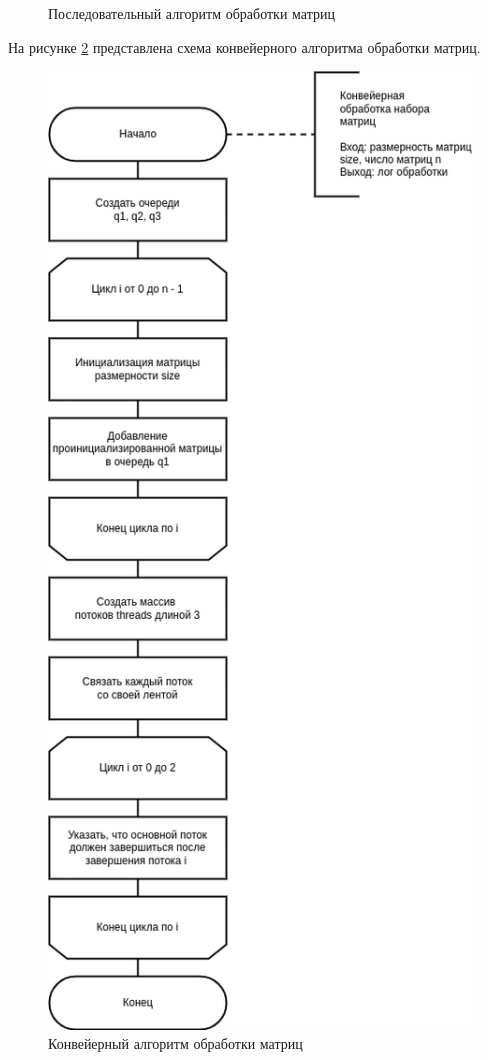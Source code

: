 \begin{figure}[H]
\begin{center}
	\end{center}
	\captionsetup{justification=centering}
	\caption{Последовательный алгоритм обработки матриц}
	\label{img:linear}
\end{figure}

На рисунке \ref{img:threads} представлена схема конвейерного алгоритма обработки матриц.

\begin{figure}[H]
	\begin{center}
		\includegraphics[scale=0.63]{img/threads.png}
	\end{center}
	\captionsetup{justification=centering}
	\caption{Конвейерный алгоритм обработки матриц}
	\label{img:threads}
\end{figure}

